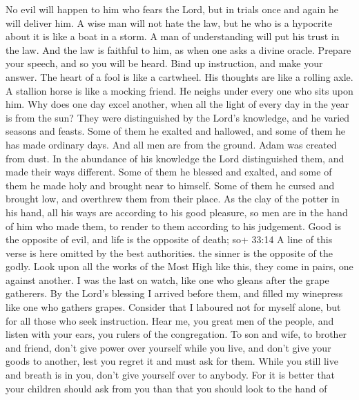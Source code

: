  No evil will happen to him who fears the Lord, but in
trials once and again he will deliver him.  A wise man will
not hate the law, but he who is a hypocrite about it is like a boat in a
storm.  A man of understanding will put his trust in the
law. And the law is faithful to him, as when one asks a divine oracle.
 Prepare your speech, and so you will be heard. Bind up
instruction, and make your answer.  The heart of a fool is
like a cartwheel. His thoughts are like a rolling axle.  A
stallion horse is like a mocking friend. He neighs under every one who
sits upon him.  Why does one day excel another, when all the
light of every day in the year is from the sun?  They were
distinguished by the Lord's knowledge, and he varied seasons and feasts.
 Some of them he exalted and hallowed, and some of them he
has made ordinary days.  And all men are from the ground.
Adam was created from dust.  In the abundance of his
knowledge the Lord distinguished them, and made their ways different.
 Some of them he blessed and exalted, and some of them he
made holy and brought near to himself. Some of them he cursed and
brought low, and overthrew them from their place.  As the
clay of the potter in his hand, all his ways are according to his good
pleasure, so men are in the hand of him who made them, to render to them
according to his judgement.  Good is the opposite of evil,
and life is the opposite of death; so+ 33:14 A line of this verse is
here omitted by the best authorities. the sinner is the opposite of the
godly.  Look upon all the works of the Most High like this,
they come in pairs, one against another.  I was the last on
watch, like one who gleans after the grape gatherers.  By
the Lord's blessing I arrived before them, and filled my winepress like
one who gathers grapes.  Consider that I laboured not for
myself alone, but for all those who seek instruction.  Hear
me, you great men of the people, and listen with your ears, you rulers
of the congregation.  To son and wife, to brother and
friend, don't give power over yourself while you live, and don't give
your goods to another, lest you regret it and must ask for them.
 While you still live and breath is in you, don't give
yourself over to anybody.  For it is better that your
children should ask from you than that you should look to the hand of
